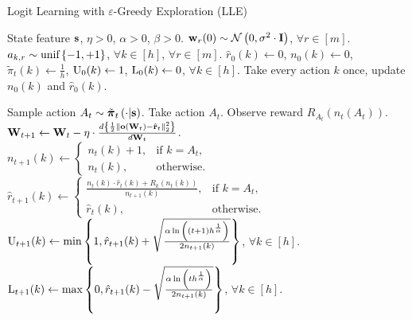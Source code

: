 \begin{algorithm}[t]
	\caption{Logit Learning with $\varepsilon$-Greedy Exploration (LLE)}
	\label{alg:logit_learning_eps_greedy_exploration}
	\begin{algorithmic}
		 State feature ${\mathbf{s}}$, $\eta > 0$, $\alpha > 0$, $\beta > 0$.
		\STATE ${\mathbf{w}}_r(0) \sim {\mathcal{N}}\left( 0, \sigma^2 \cdot {\mathbf{I}} \right)$, $\forall r \in [m]$. $a_{k, r} \sim {\text{unif}}\left\{-1, +1\right\}$, $\forall k \in [h]$, $\forall r \in [m]$.
		\STATE $\hat{r}_{0}(k) \gets 0$, $n_{0}(k) \gets 0$, $\tilde{\pi}_t(k) \gets \frac{1}{h}$, ${\text{U}}_{0}(k) \gets 1$, ${\text{L}}_{0}(k) \gets 0$, $\forall k \in [h]$.
		\STATE Take every action $k$ once, update $n_{0}(k)$ and $\hat{r}_{0}(k)$.
		
		\STATE Sample action $A_{t} \sim \tilde{{\boldsymbol{\pi}}}_t\left(\cdot \middle| {\mathbf{s}} \right)$. Take action $A_{t}$. Observe reward $R_{ A_{t}}\left(n_{t}\left(A_t\right) \right)$.
		\STATE ${\mathbf{W}}_{t+1} \leftarrow {\mathbf{W}}_t - \eta \cdot \frac{d \left\{ \frac{1}{2} \left\| {\mathbf{o}}\left( {\mathbf{W}}_t\right) - \hat{{\mathbf{r}}}_t \right\|_2^2 \right\}}{d {\mathbf{W}}_t}$.
		\STATE $n_{t+1}(k) \gets \left. 
		    \begin{cases}
		    n_{t}(k) + 1, & \text{if } k = A_t, \\
		    n_{t}(k), & \text{otherwise}.
		    \end{cases}
		    \right. \qquad$
		$\hat{r}_{t+1}(k) \gets \left. 
		    \begin{cases}
		    \frac{n_{t}(k) \cdot \hat{r}_{t}(k) + R_{k}\left(n_{t}(k)\right) }{n_{t+1}(k)}, & \text{if } k = A_t, \\
		    \hat{r}_{t}(k), & \text{otherwise}.
		    \end{cases}
		    \right.$
		\STATE ${\text{U}}_{t+1}(k) \gets
		    \min{\left\{ 1, \hat{r}_{t+1}(k) + \sqrt{\frac{\alpha \ln{\left( (t+1) h^{\frac{1}{\alpha}}\right)}}{2 n_{t+1}(k)}}\right\}}$, $\forall k \in [h]$.
		\STATE ${\text{L}}_{t+1}(k) \gets 
		    \max{\left\{ 0, \hat{r}_{t+1}(k) - \sqrt{\frac{\alpha \ln{\left( t h^{\frac{1}{\alpha}}\right)}}{2 n_{t+1}(k)}}\right\}}$, $\forall k \in [h]$.
		

\end{algorithmic}
\end{algorithm}
